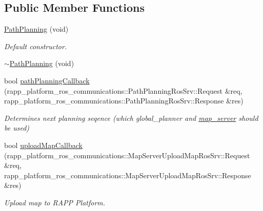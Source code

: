 \subsection*{Public Member Functions}
\begin{DoxyCompactItemize}
\item 
\hyperlink{classPathPlanning_a4a883f95ad5022c7fb80b49b7a1e4d71}{Path\-Planning} (void)
\begin{DoxyCompactList}\small\item\em Default constructor. \end{DoxyCompactList}\item 
\hyperlink{classPathPlanning_ae87cafad0b154631f91ea576142f44df}{$\sim$\-Path\-Planning} (void)
\item 
bool \hyperlink{classPathPlanning_a6451e5aac084a63136bcb809d9207d43}{path\-Planning\-Callback} (rapp\-\_\-platform\-\_\-ros\-\_\-communications\-::\-Path\-Planning\-Ros\-Srv\-::\-Request \&req, rapp\-\_\-platform\-\_\-ros\-\_\-communications\-::\-Path\-Planning\-Ros\-Srv\-::\-Response \&res)
\begin{DoxyCompactList}\small\item\em Determines next planning seqence (which global\-\_\-planner and \hyperlink{namespacemap__server}{map\-\_\-server} should be used) \end{DoxyCompactList}\item 
bool \hyperlink{classPathPlanning_adc015b964eb39c733ff95a4e38d150fe}{upload\-Map\-Callback} (rapp\-\_\-platform\-\_\-ros\-\_\-communications\-::\-Map\-Server\-Upload\-Map\-Ros\-Srv\-::\-Request \&req, rapp\-\_\-platform\-\_\-ros\-\_\-communications\-::\-Map\-Server\-Upload\-Map\-Ros\-Srv\-::\-Response \&res)
\begin{DoxyCompactList}\small\item\em Upload map to R\-A\-P\-P Platform. \end{DoxyCompactList}\end{DoxyCompactItemize}
